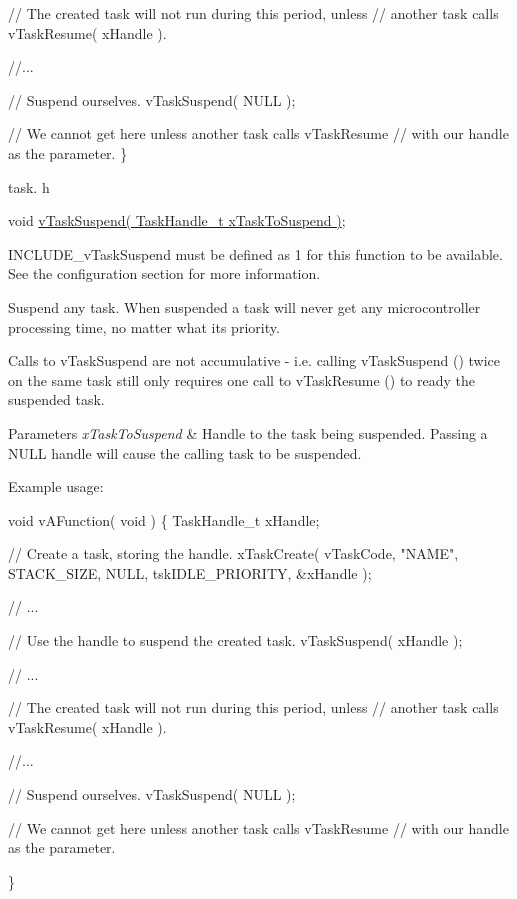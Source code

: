 \begin{DoxyPre}  // The created task will not run during this period, unless
  // another task calls vTaskResume( xHandle ).\end{DoxyPre}



\begin{DoxyPre}  //...\end{DoxyPre}



\begin{DoxyPre}  // Suspend ourselves.
  vTaskSuspend( NULL );\end{DoxyPre}



\begin{DoxyPre}  // We cannot get here unless another task calls vTaskResume
  // with our handle as the parameter.
\}
\end{DoxyPre}


task. h 
\begin{DoxyPre}void \hyperlink{externals_2freertos_2include_2task_8h_a84d4e660b04630be2939d91b3c2412f8}{vTaskSuspend( TaskHandle\_t xTaskToSuspend )};\end{DoxyPre}


I\+N\+C\+L\+U\+D\+E\+\_\+v\+Task\+Suspend must be defined as 1 for this function to be available. See the configuration section for more information.

Suspend any task. When suspended a task will never get any microcontroller processing time, no matter what its priority.

Calls to v\+Task\+Suspend are not accumulative -\/ i.\+e. calling v\+Task\+Suspend () twice on the same task still only requires one call to v\+Task\+Resume () to ready the suspended task.


\begin{DoxyParams}{Parameters}
{\em x\+Task\+To\+Suspend} & Handle to the task being suspended. Passing a N\+U\+LL handle will cause the calling task to be suspended.\\
\hline
\end{DoxyParams}
Example usage\+: 
\begin{DoxyPre}
void vAFunction( void )
\{
TaskHandle\_t xHandle;
\begin{DoxyVerb}// Create a task, storing the handle.
xTaskCreate( vTaskCode, "NAME", STACK_SIZE, NULL, tskIDLE_PRIORITY, &xHandle );

// ...

// Use the handle to suspend the created task.
vTaskSuspend( xHandle );

// ...

// The created task will not run during this period, unless
// another task calls vTaskResume( xHandle ).

//...


// Suspend ourselves.
vTaskSuspend( NULL );

// We cannot get here unless another task calls vTaskResume
// with our handle as the parameter.
\end{DoxyVerb}

\}
  \end{DoxyPre}
 